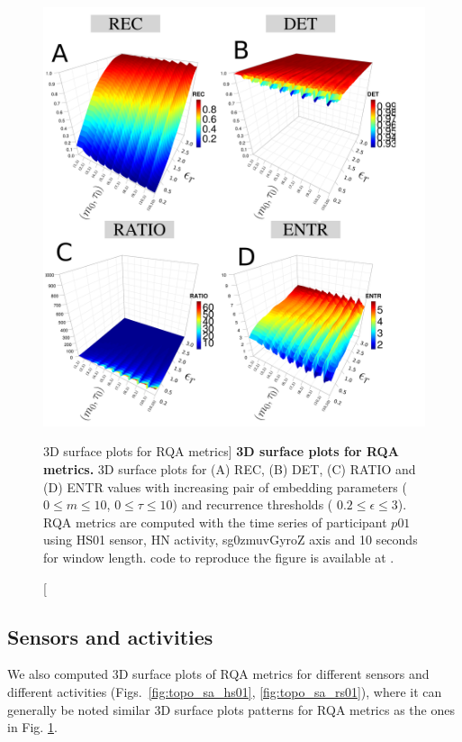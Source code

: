 \begin{figure}
\centering
\includegraphics[width=1.0\textwidth]{fig_6_09}
    \caption
	[3D surface plots for RQA metrics]{
	{\bf 3D surface plots for RQA metrics.}
	3D surface plots for (A) REC, (B) DET, (C) RATIO and (D) ENTR values 
	with increasing pair of embedding parameters 
	($0 \le m \le 10$, $0 \le \tau \le 10$) 
	and recurrence thresholds (  $ 0.2 \le \epsilon \le 3 $).
	RQA metrics are computed with the time series of participant $p01$ using 
	HS01 sensor, HN activity, sg0zmuvGyroZ axis and 10 seconds 
	for window length.
 	\R code to reproduce the figure is available at 
	.
	}
\label{fig:topo_rqas}
\end{figure}

\newpage
\subsection{Sensors and activities}
We also computed 3D surface plots of RQA metrics for different sensors 
and different activities 
(Figs.~\ref{fig:topo_sa_hs01}, \ref{fig:topo_sa_rs01}), where it can 
generally be noted similar 3D surface plots patterns for RQA metrics as the ones
in Fig. \ref{fig:topo_rqas}. 

